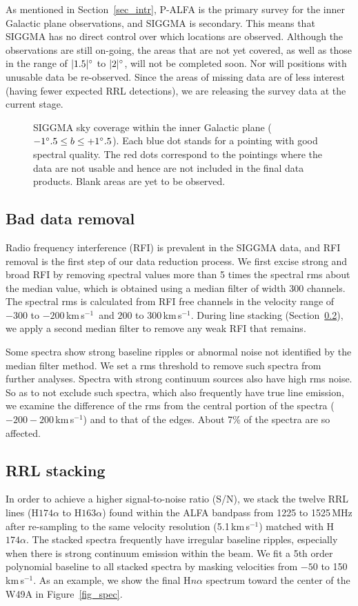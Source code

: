 \documentclass[manuscript]{aastex61}
\newcommand{\kms}{\,km\,s$^{-1}$}
\begin{document}
As mentioned in Section~\ref{sec_intr}, P-ALFA is the primary survey for the inner Galactic plane observations, and SIGGMA is secondary.
This means that SIGGMA has no direct control over which locations are observed.  Although the observations are still on-going, the areas that are not yet covered, as well as those in the range of $|1.5|\mbox{$^\circ$}$ to $|2|\mbox{$^\circ$}$, will not be completed soon.  Nor will positions with unusable data be re-observed.
Since the areas of missing data are of less interest (having fewer expected RRL detections), we are releasing the survey data at the current stage.

\begin{figure}[hbtp]
\caption{SIGGMA sky coverage within the inner Galactic plane ($-1\mbox{$^\circ$}.5 \le b \le +1\mbox{$^\circ$}.5$).
Each blue dot stands for a pointing with good spectral quality.
The red dots correspond to the pointings where the data are not usable and hence are not included in the final data products.
Blank areas are yet to be observed.
}\label{fig_skycover}
\end{figure}

\subsection{Bad data removal} \label{sec_rfi}
Radio frequency interference (RFI) is prevalent in the SIGGMA data, and
RFI removal is the first step of our data reduction process.
We first excise strong and broad RFI by removing spectral values more than 5 times the spectral rms about the median value, which is obtained using a median filter of width 300 channels.
The spectral rms is calculated from RFI free channels in the velocity range of $-300$ to $-200$\kms\ and $200$ to $300$\kms.
During line stacking (Section~\ref{sec_stack}), we apply a second median filter to remove any weak RFI that remains.

Some spectra show strong baseline ripples or abnormal noise not identified by the median filter method.
We set a rms threshold to remove such spectra from further analyses.
Spectra with strong continuum sources also have high rms noise. 
So as to not exclude such spectra, which also frequently have true line emission, we examine the difference of the rms from the central portion of the spectra ($-200 - 200$\kms) and to that of the edges.
About 7\% of the spectra are so affected.

\subsection{RRL stacking} \label{sec_stack}
In order to achieve a higher signal-to-noise ratio (S/N), we stack the twelve RRL lines (H$174\alpha$ to H$163\alpha$) found within the ALFA bandpass from 1225 to 1525\,MHz after re-sampling to the same velocity resolution (5.1\kms) matched with H$174\alpha$.
The stacked spectra frequently have irregular baseline ripples, especially when there is strong continuum emission within the beam.
We fit a 5th order polynomial baseline to all stacked spectra by masking velocities from $-50$ to 150\kms.
As an example, we show the final H$n\alpha$ spectrum toward the center of the W49A in Figure~\ref{fig_spec}.
\end{document}
